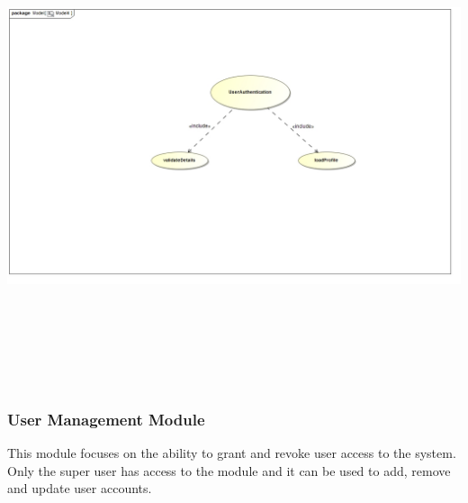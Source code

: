 \documentclass[english]{article}
\begin{document}
		\includegraphics[width=14cm,height=14cm,keepaspectratio]{Authenticate.jpg}

		\subsubsection{User Management Module}
		This module focuses on the ability to grant and revoke user access to the system. Only the super user has access to the module and it can be used to add, remove and update user accounts.
		
\end{document}
